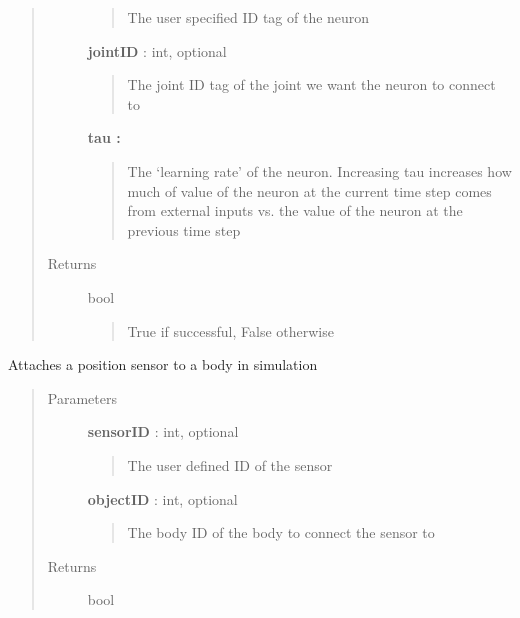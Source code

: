 \documentclass[letterpaper,10pt,english]{sphinxmanual}
\begin{document}
\begin{fulllineitems}
\begin{fulllineitems}
\begin{quote}
\begin{description}
\begin{quote}
The user specified ID tag of the neuron
\end{quote}

\textbf{jointID} : int, optional
\begin{quote}

The joint ID tag of the joint we want the neuron to connect to
\end{quote}

\textbf{tau      :}
\begin{quote}

The `learning rate' of the neuron. Increasing tau increases
how much of value of the neuron at the current time step comes
from external inputs vs. the value of the neuron at the previous
time step
\end{quote}

\item[{Returns}] \leavevmode
bool
\begin{quote}

True if successful, False otherwise
\end{quote}

\end{description}\end{quote}

\end{fulllineitems}


\begin{fulllineitems}
\label{code:pyrosim.PYROSIM.Send_Position_Sensor}
Attaches a position sensor to a body in simulation
\begin{quote}\begin{description}
\item[{Parameters}] \leavevmode
\textbf{sensorID} : int, optional
\begin{quote}

The user defined ID of the sensor
\end{quote}

\textbf{objectID} : int, optional
\begin{quote}

The body ID of the body to connect the sensor to
\end{quote}

\item[{Returns}] \leavevmode
bool
\begin{quote}


\end{quote}
\end{description}
\end{quote}
\end{fulllineitems}
\end{fulllineitems}
\end{document}
